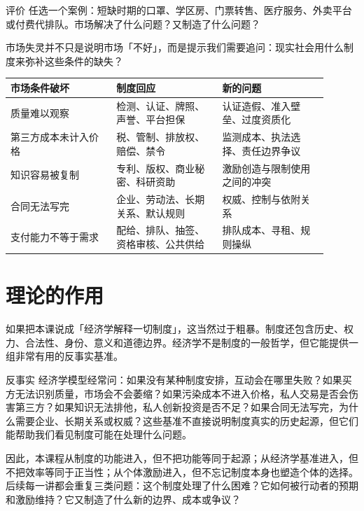 \documentclass[UTF8,10pt,a4paper,scheme=chinese]{ctexart}
\begin{document}
\begin{discussionbox}{评价}
任选一个案例：短缺时期的口罩、学区房、门票转售、医疗服务、外卖平台或付费代排队。市场解决了什么问题？又制造了什么问题？
\end{discussionbox}

市场失灵并不只是说明市场「不好」，而是提示我们需要追问：现实社会用什么制度来弥补这些条件的缺失？

\begin{center}
\small
\begin{tabular}{p{0.30\linewidth}p{0.30\linewidth}p{0.30\linewidth}}
\hline
\textbf{市场条件破坏} & \textbf{制度回应} & \textbf{新的问题} \tabularnewline
\hline
质量难以观察 & 检测、认证、牌照、声誉、平台担保 & 认证造假、准入壁垒、过度资质化 \tabularnewline
第三方成本未计入价格 & 税、管制、排放权、赔偿、禁令 & 监测成本、执法选择、责任边界争议 \tabularnewline
知识容易被复制 & 专利、版权、商业秘密、科研资助 & 激励创造与限制使用之间的冲突 \tabularnewline
合同无法写完 & 企业、劳动法、长期关系、默认规则 & 权威、控制与依附关系 \tabularnewline
支付能力不等于需求 & 配给、排队、抽签、资格审核、公共供给 & 排队成本、寻租、规则操纵 \tabularnewline
\hline
\end{tabular}
\end{center}

\section{理论的作用}
如果把本课说成「经济学解释一切制度」，这当然过于粗暴。制度还包含历史、权力、合法性、身份、意义和道德边界。经济学不是制度的一般哲学，但它能提供一组非常有用的反事实基准。

\begin{insightbox}{反事实}
经济学模型经常问：如果没有某种制度安排，互动会在哪里失败？如果买方无法识别质量，市场会不会萎缩？如果污染成本不进入价格，私人交易是否会伤害第三方？如果知识无法排他，私人创新投资是否不足？如果合同无法写完，为什么需要企业、长期关系或权威？这些基准不直接说明制度真实的历史起源，但它们能帮助我们看见制度可能在处理什么问题。
\end{insightbox}

因此，本课程从制度的功能进入，但不把功能等同于起源；从经济学基准进入，但不把效率等同于正当性；从个体激励进入，但不忘记制度本身也塑造个体的选择。后续每一讲都会重复三类问题：这个制度处理了什么困难？它如何被行动者的预期和激励维持？它又制造了什么新的边界、成本或争议？
\end{document}
